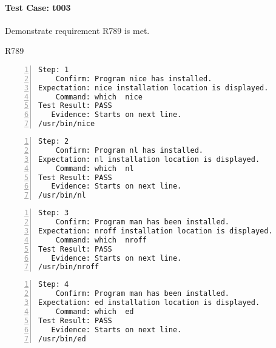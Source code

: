 \paragraph{Test Case: t003}
\begin{description}[align=right,leftmargin=*,labelindent=3cm]
\item[Purpose:] Demonstrate requirement R789 is met.
\item[Requirement:] R789
\end{description}
\begin{lstlisting}[numbers=left]
       Step: 1
    Confirm: Program nice has installed.
Expectation: nice installation location is displayed.
    Command: which  nice 
Test Result: PASS
   Evidence: Starts on next line.
/usr/bin/nice

\end{lstlisting}
\begin{lstlisting}[numbers=left]
       Step: 2
    Confirm: Program nl has installed.
Expectation: nl installation location is displayed.
    Command: which  nl 
Test Result: PASS
   Evidence: Starts on next line.
/usr/bin/nl

\end{lstlisting}
\begin{lstlisting}[numbers=left]
       Step: 3
    Confirm: Program man has been installed.
Expectation: nroff installation location is displayed.
    Command: which  nroff 
Test Result: PASS
   Evidence: Starts on next line.
/usr/bin/nroff

\end{lstlisting}
\begin{lstlisting}[numbers=left]
       Step: 4
    Confirm: Program man has been installed.
Expectation: ed installation location is displayed.
    Command: which  ed 
Test Result: PASS
   Evidence: Starts on next line.
/usr/bin/ed

\end{lstlisting}
